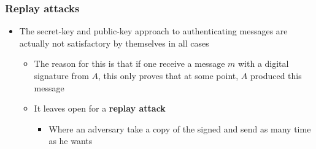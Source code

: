 \documentclass[11pt]{article}
\begin{document}
\subsubsection{Replay attacks}
\label{sec:org745c7f1}
\begin{itemize}
\item The secret-key and public-key approach to authenticating messages are actually not satisfactory by themselves in all cases
\begin{itemize}
\item The reason for this is that if one receive a message \(m\) with a digital signature from \(A\), this only proves that at some point, \(A\) produced this message
\item It leaves open for a \textbf{replay attack}
\begin{itemize}
\item Where an adversary take a copy of the signed and send as many time as he wants
\end{itemize}
\end{itemize}


\end{itemize}
\end{document}
